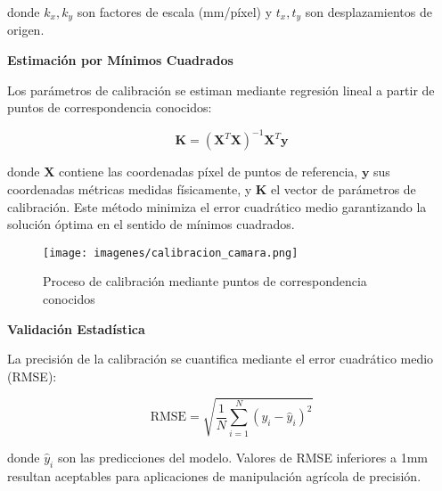 donde $k_x, k_y$ son factores de escala (mm/píxel) y $t_x, t_y$ son desplazamientos de origen.

\textbf{Estimación por Mínimos Cuadrados}

Los parámetros de calibración se estiman mediante regresión lineal a partir de puntos de correspondencia conocidos:

\begin{equation}
\mathbf{K} = (\mathbf{X}^T\mathbf{X})^{-1}\mathbf{X}^T\mathbf{y}
\end{equation}

donde $\mathbf{X}$ contiene las coordenadas píxel de puntos de referencia, $\mathbf{y}$ sus coordenadas métricas medidas físicamente, y $\mathbf{K}$ el vector de parámetros de calibración. Este método minimiza el error cuadrático medio garantizando la solución óptima en el sentido de mínimos cuadrados.

\begin{figure}[h]
\centering
\texttt{[image: imagenes/calibracion\_camara.png]}
\caption{Proceso de calibración mediante puntos de correspondencia conocidos}
\label{fig:calibracion}
\end{figure}

\textbf{Validación Estadística}

La precisión de la calibración se cuantifica mediante el error cuadrático medio (RMSE):

\begin{equation}
\text{RMSE} = \sqrt{\frac{1}{N}\sum_{i=1}^{N}(y_i - \hat{y}_i)^2}
\end{equation}

donde $\hat{y}_i$ son las predicciones del modelo. Valores de RMSE inferiores a 1mm resultan aceptables para aplicaciones de manipulación agrícola de precisión.
